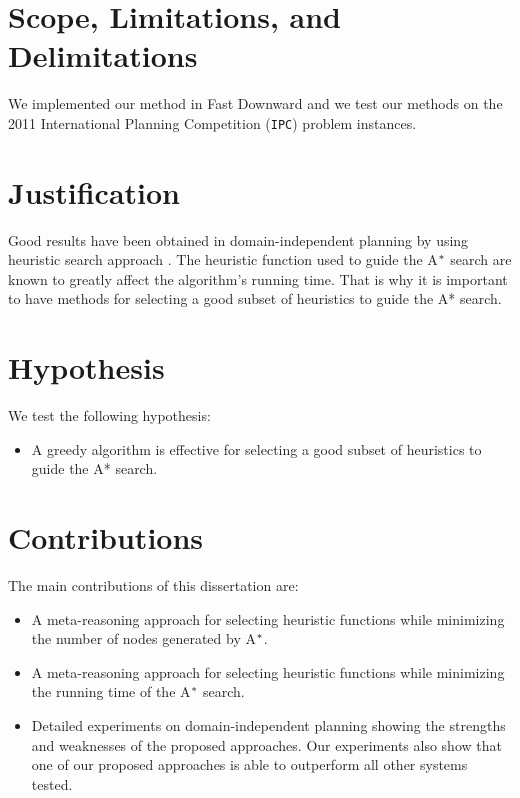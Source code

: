 \section{Scope, Limitations, and Delimitations}
\noindent
We implemented our method in Fast Downward \cite{helmert2006fast} and we test our methods on the 2011 International Planning Competition (\texttt{IPC}) problem instances.

\section{Justification}
\noindent
Good results have been obtained in domain-independent planning by using heuristic search approach \cite{bonet2001planning}. The heuristic function used to guide the A$\sp{*}$ search are known to greatly affect the algorithm's running time. That is why it is important to have methods for selecting a good subset of heuristics to guide the A* search.


\section{Hypothesis}
\noindent
We test the following hypothesis:
\begin{itemize}
\item A greedy algorithm is effective for selecting a good subset of heuristics to guide the A* search.
\end{itemize}

\section{Contributions}
\noindent
The main contributions of this dissertation are:
\begin{itemize}
\item A meta-reasoning approach for selecting heuristic functions while minimizing the number of nodes generated by A$\sp{*}$.

\item A meta-reasoning approach for selecting heuristic functions while minimizing the running time of the A$\sp{*}$ search. 

\item Detailed experiments on domain-independent planning showing the strengths and weaknesses of the proposed approaches. Our experiments also show that one of our proposed approaches is able to outperform all other systems tested. 

\end{itemize}

